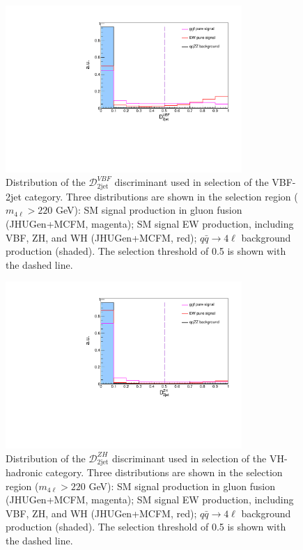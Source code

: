 \begin{figure}[!hbt]
\centering
\includegraphics[width=0.8\textwidth]{figures/D2JVBF_cat.pdf}
\caption{
Distribution of the $\mathcal{D}_\mathrm{2jet}^{VBF}$ discriminant used in selection of the VBF-2jet category. 
Three distributions are shown in the \offshell selection region ($m_{4\ell}>220$ GeV):
SM signal \offshell production in gluon fusion (JHUGen+MCFM, magenta); 
SM signal \offshell EW production, including VBF, ZH, and WH (JHUGen+MCFM, red); 
$q\bar{q}\to 4\ell$ background production (shaded). 
The selection threshold of 0.5 is shown with the dashed line. 
}
\label{fig:SelectionDiscriminant_D2jetVBF}
\end{figure}
\begin{figure}[!hbt]
\centering
\includegraphics[width=0.8\textwidth]{figures/D2JZH_cat.pdf}
\caption{
Distribution of the $\mathcal{D}_\mathrm{2jet}^{ZH}$  discriminant used in selection of the VH-hadronic category. 
Three distributions are shown in the \offshell selection region ($m_{4\ell}>220$ GeV):
SM signal \offshell production in gluon fusion (JHUGen+MCFM, magenta); 
SM signal \offshell EW production, including VBF, ZH, and WH (JHUGen+MCFM, red); 
$q\bar{q}\to 4\ell$ background production (shaded). 
The selection threshold of 0.5 is shown with the dashed line. 
}
\label{fig:SelectionDiscriminant_D2jetZH}
\end{figure}
